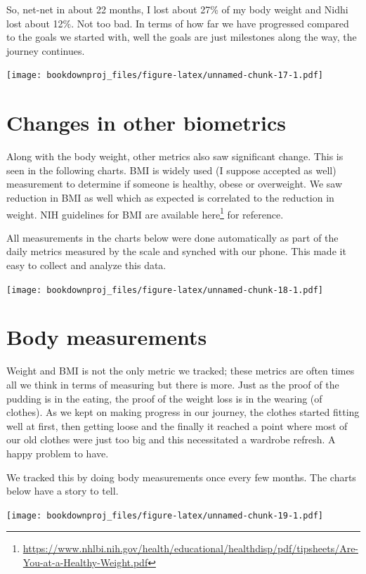 \documentclass[
  oneside]{book}
\DeclareRobustCommand{\href}[2]{#2\footnote{\url{#1}}}
\begin{document}
So, net-net in about 22 months, I lost about 27\% of my body weight and Nidhi lost about 12\%. Not too bad. In terms of how far we have progressed compared to the goals we started with, well the goals are just milestones along the way, the journey continues.

\texttt{[image: bookdownproj\_files/figure-latex/unnamed-chunk-17-1.pdf]}

\hypertarget{changes-in-other-biometrics}{%
\section{Changes in other biometrics}\label{changes-in-other-biometrics}}

Along with the body weight, other metrics also saw significant change. This is seen in the following charts. BMI is widely used (I suppose accepted as well) measurement to determine if someone is healthy, obese or overweight. We saw reduction in BMI as well which as expected is correlated to the reduction in weight. NIH guidelines for BMI are available \href{https://www.nhlbi.nih.gov/health/educational/healthdisp/pdf/tipsheets/Are-You-at-a-Healthy-Weight.pdf}{here} for reference.

All measurements in the charts below were done automatically as part of the daily metrics measured by the scale and synched with our phone. This made it easy to collect and analyze this data.

\texttt{[image: bookdownproj\_files/figure-latex/unnamed-chunk-18-1.pdf]}

\hypertarget{body-measurements}{%
\section{Body measurements}\label{body-measurements}}

Weight and BMI is not the only metric we tracked; these metrics are often times all we think in terms of measuring but there is more. Just as the proof of the pudding is in the eating, the proof of the weight loss is in the wearing (of clothes). As we kept on making progress in our journey, the clothes started fitting well at first, then getting loose and the finally it reached a point where most of our old clothes were just too big and this necessitated a wardrobe refresh. A happy problem to have.

We tracked this by doing body measurements once every few months. The charts below have a story to tell.

\texttt{[image: bookdownproj\_files/figure-latex/unnamed-chunk-19-1.pdf]}
\end{document}
